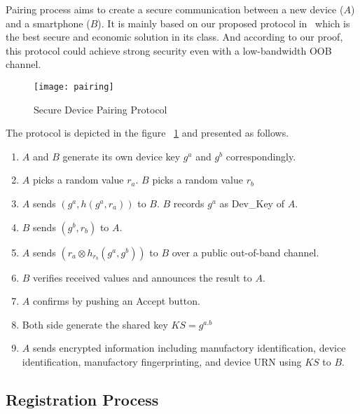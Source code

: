 Pairing process aims to create a secure communication between a new device ($A$) and a smartphone ($B$). It is mainly based on our proposed protocol in~\cite{7158026} which is the best secure and economic solution in its class.  And according to our proof, this protocol could achieve strong security even with a low-bandwidth OOB channel. 

\begin{figure}
  \centering
  \texttt{[image: pairing]}
  \caption{Secure Device Pairing Protocol}
  \label{devicepairing}
\end{figure}

The protocol is depicted in the figure ~\ref{devicepairing} and presented as follows. 
\begin{enumerate}
\item $A$ and $B$ generate its own device key $g^a$ and $g^b$ correspondingly. 
\item $A$ picks a random value $r_a$. $B$ picks a random value $r_b$
\item $A$ sends $(g^a,h(g^a,r_a))$ to $B$. $B$ records $g^a$ as Dev\_Key of $A$. 
\item $B$ sends $(g^b,r_b)$ to $A$.
\item $A$ sends $(r_a \otimes h_{r_b}(g^a,g^b) )$ to $B$ over a public out-of-band channel. 
\item $B$ verifies received values and announces the result to $A$. 
\item $A$ confirms by pushing an Accept button. 
\item Both side generate the shared key $KS = g^{a.b}$
\item $A$ sends encrypted information including manufactory identification, device identification, manufactory fingerprinting, and device URN using $KS$ to $B$. 
\end{enumerate}

\subsection{Registration Process}

